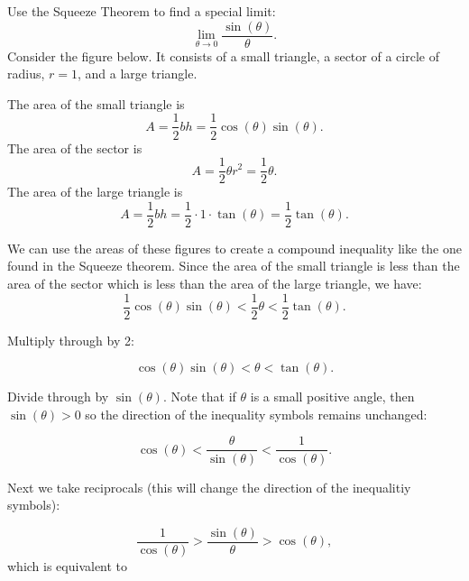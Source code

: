 \documentclass[handout]{ximera}
\begin{document}
\begin{example}[example 3]
Use the Squeeze Theorem to find a special limit: 
\[
\lim_{\theta \to 0} \frac{\sin(\theta)}{\theta}.
\]
Consider the figure below.  It consists of a small triangle, a sector of a circle of radius,  $r = 1$, and a large triangle.

\begin{image}
\end{image}







The area of the small triangle is 
\[
A = \frac12 bh = \frac12 \cos(\theta) \sin(\theta).
\]
The area of the sector is 
\[
A = \frac12 \theta r^2 = \frac12 \theta.
\]
The area of the large triangle is 
\[
A = \frac12 bh = \frac12 \cdot 1 \cdot \tan(\theta) = \frac12 \tan(\theta).
\]

We can use the areas of these figures to create a compound inequality like the one found in the Squeeze theorem.
Since the area of the small triangle is less than the area of the sector which is less than the area of the large triangle, we have:
\[
\frac12 \cos(\theta) \sin(\theta) < \frac12 \theta < \frac12 \tan(\theta).
\]

Multiply through by 2:

\[
\cos(\theta) \sin(\theta) < \theta < \tan(\theta).
\]

Divide through by $\sin(\theta)$.  Note that if $\theta$ is a small positive angle, then $\sin(\theta) >0$ so the direction of the inequality symbols remains unchanged:

\[
\cos(\theta)  < \frac{ \theta}{\sin(\theta)} < \frac{1}{\cos(\theta)}.
\]

Next we take reciprocals (this will change the direction of the inequalitiy symbols):

\[
\frac{1}{\cos(\theta)}  > \frac{\sin(\theta)}{\theta} > \cos(\theta),
\]
which is equivalent to 


\end{example}
\end{document}
